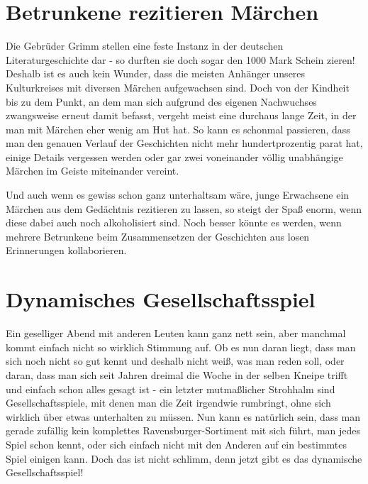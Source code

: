 \documentclass[a5paper,pagesize,10pt,bibtotoc,pointlessnumbers,normalheadings,DIV=9,twoside=false]{scrbook}
\begin{document}
\chapter{Betrunkene rezitieren Märchen}

Die Gebrüder Grimm stellen eine feste Instanz in der deutschen Literaturgeschichte dar - so durften sie doch sogar den 1000 Mark Schein zieren!
Deshalb ist es auch kein Wunder, dass die meisten Anhänger unseres Kulturkreises mit diversen Märchen aufgewachsen sind.
Doch von der Kindheit bis zu dem Punkt, an dem man sich aufgrund des eigenen Nachwuchses zwangsweise erneut damit befasst, vergeht meist eine durchaus lange Zeit, in der man mit Märchen eher wenig am Hut hat.
So kann es schonmal passieren, dass man den genauen Verlauf der Geschichten nicht mehr hundertprozentig parat hat, einige Details vergessen werden oder gar zwei voneinander völlig unabhängige Märchen im Geiste miteinander vereint.

Und auch wenn es gewiss schon ganz unterhaltsam wäre, junge Erwachsene ein Märchen aus dem Gedächtnis rezitieren zu lassen, so steigt der Spaß enorm, wenn diese dabei auch noch alkoholisiert sind.
Noch besser könnte es werden, wenn mehrere Betrunkene beim Zusammensetzen der Geschichten aus losen Erinnerungen kollaborieren.


\chapter{Dynamisches Gesellschaftsspiel}

Ein geselliger Abend mit anderen Leuten kann ganz nett sein, aber manchmal kommt einfach nicht so wirklich Stimmung auf.
Ob es nun daran liegt, dass man sich noch nicht so gut kennt und deshalb nicht weiß, was man reden soll, oder daran, dass man sich seit Jahren dreimal die Woche in der selben Kneipe trifft und einfach schon alles gesagt ist - ein letzter mutmaßlicher Strohhalm sind Gesellschaftsspiele, mit denen man die Zeit irgendwie rumbringt, ohne sich wirklich über etwas unterhalten zu müssen.
Nun kann es natürlich sein, dass man gerade zufällig kein komplettes Ravensburger-Sortiment mit sich führt, man jedes Spiel schon kennt, oder sich einfach nicht mit den Anderen auf ein bestimmtes Spiel einigen kann.
Doch das ist nicht schlimm, denn jetzt gibt es das dynamische Gesellschaftsspiel!
\end{document}
